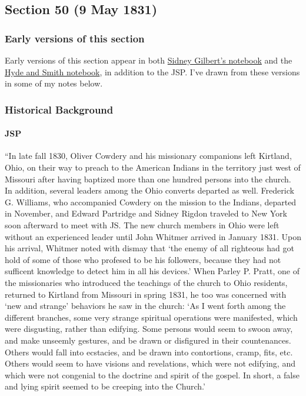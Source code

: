 \subsection{Section 50 (9 May 1831)}
	\label{DC50}
	
	\subsubsection{Early versions of this section}
	
		Early versions of this section appear in both \hyperref[EXSS-DC50-EARLY-GILBERT]{Sidney Gilbert's notebook} and the \hyperref[EXSS-DC50-EARLY-NOTEBOOK]{Hyde and Smith notebook}, in addition to the JSP. I've drawn from these versions in some of my notes below.
	
	\subsubsection{Historical Background}
		\label{DC50-HB}
		
		\paragraph{JSP}
		
			``In late fall 1830, Oliver Cowdery and his missionary companions left Kirtland, Ohio, on their way to preach to the American Indians in the territory just west of Missouri after having baptized more than one hundred persons into the church. In addition, several leaders among the Ohio converts departed as well. Frederick G. Williams, who accompanied Cowdery on the mission to the Indians, departed in November, and Edward Partridge and Sidney Rigdon traveled to New York soon afterward to meet with JS. The new church members in Ohio were left without an experienced leader until John Whitmer arrived in January 1831. Upon his arrival, Whitmer noted with dismay that `the enemy of all righteous had got hold of some of those who profesed to be his followers, because they had not sufficent knowledge to detect him in all his devices.' When Parley P. Pratt, one of the missionaries who introduced the teachings of the church to Ohio residents, returned to Kirtland from Missouri in spring 1831, he too was concerned with `new and strange' behaviors he saw in the church: `As I went forth among the different branches, some very strange spiritual operations were manifested, which were disgusting, rather than edifying. Some persons would seem to swoon away, and make unseemly gestures, and be drawn or disfigured in their countenances. Others would fall into ecstacies, and be drawn into contortions, cramp, fits, etc. Others would seem to have visions and revelations, which were not edifying, and which were not congenial to the doctrine and spirit of the gospel. In short, a false and lying spirit seemed to be creeping into the Church.'
			
